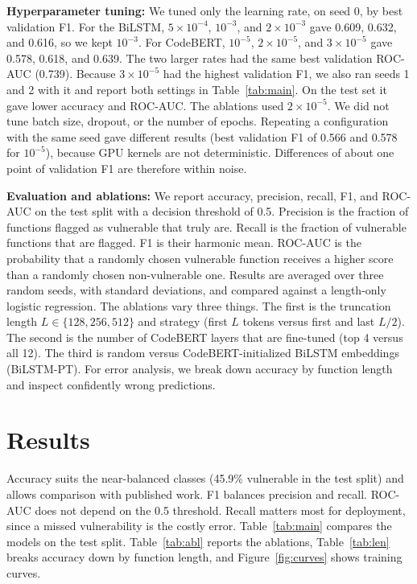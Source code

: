 \documentclass{article}
\begin{document}
\textbf{Hyperparameter tuning:}
We tuned only the learning rate, on seed 0, by best validation F1. For the BiLSTM, $5\times10^{-4}$, $10^{-3}$, and $2\times10^{-3}$ gave 0.609, 0.632, and 0.616, so we kept $10^{-3}$.
For CodeBERT, $10^{-5}$, $2\times10^{-5}$, and $3\times10^{-5}$ gave 0.578, 0.618, and 0.639. The two larger rates had the same best validation ROC-AUC (0.739).
Because $3\times10^{-5}$ had the highest validation F1, we also ran seeds 1 and 2 with it and report both settings in Table~\ref{tab:main}. On the test set it gave lower accuracy and ROC-AUC. The ablations used $2\times10^{-5}$. We did not tune batch size, dropout, or the number of epochs.
Repeating a configuration with the same seed gave different results (best validation F1 of 0.566 and 0.578 for $10^{-5}$), because GPU kernels are not deterministic. Differences of about one point of validation F1 are therefore within noise.

\textbf{Evaluation and ablations:}
We report accuracy, precision, recall, F1, and ROC-AUC on the test split with a decision threshold of 0.5. Precision is the fraction of functions flagged as vulnerable that truly are. Recall is the fraction of vulnerable functions that are flagged. F1 is their harmonic mean. ROC-AUC is the probability that a randomly chosen vulnerable function receives a higher score than a randomly chosen non-vulnerable one.
Results are averaged over three random seeds, with standard deviations, and compared against a length-only logistic regression.
The ablations vary three things. The first is the truncation length $L \in \{128, 256, 512\}$ and strategy (first $L$ tokens versus first and last $L/2$). The second is the number of CodeBERT layers that are fine-tuned (top 4 versus all 12). The third is random versus CodeBERT-initialized BiLSTM embeddings (BiLSTM-PT).
For error analysis, we break down accuracy by function length and inspect confidently wrong predictions.

\section{Results}

Accuracy suits the near-balanced classes (45.9\% vulnerable in the test split) and allows comparison with published work. F1 balances precision and recall. ROC-AUC does not depend on the 0.5 threshold. Recall matters most for deployment, since a missed vulnerability is the costly error.
Table~\ref{tab:main} compares the models on the test split. Table~\ref{tab:abl} reports the ablations, Table~\ref{tab:len} breaks accuracy down by function length, and Figure~\ref{fig:curves} shows training curves.
\end{document}
